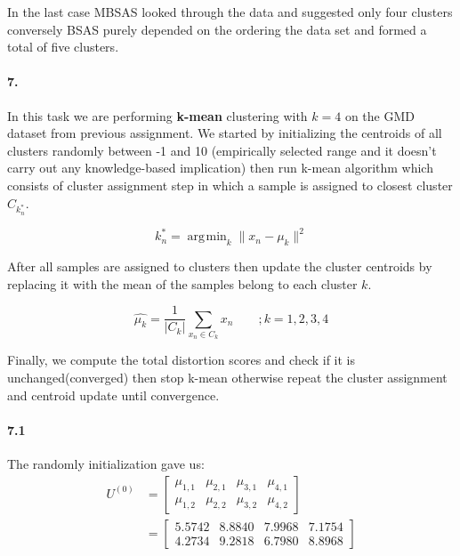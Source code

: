 \documentclass[a4paper]{article}
\DeclareMathOperator*{\argmin}{\arg\!\min}
\begin{document}
	\noindent In the last case MBSAS looked through the data and suggested only four clusters conversely BSAS purely depended on the ordering the data set and formed a total of five clusters.
	
\paragraph{7.} In this task we are performing \textbf{k-mean} clustering with $k = 4$ on the GMD dataset from previous assignment. We started by initializing the centroids of all clusters randomly between -1 and 10 (empirically selected range and it doesn't carry out any knowledge-based implication) then run k-mean algorithm which consists of cluster assignment step in which a sample is assigned to closest cluster $C_{k_n^{\ast}}$.

	\begin{equation}
		k_n^{\ast} = \argmin_k \|x_n - \mu_k\|^2
	\end{equation}
	
	After all samples are assigned to clusters then update the cluster centroids by replacing it with the mean of the samples belong to each cluster $k$.
	
	\begin{equation}
		\hat{\mu_k} = \frac{1}{|C_k|} \sum_{x_n \in C_k} x_n \qquad	; k=1,2,3,4
	\end{equation}
	
	Finally, we compute the total distortion scores and check if it is unchanged(converged) then stop k-mean otherwise repeat the cluster assignment and centroid update until convergence. \\
	
\paragraph{7.1} The randomly initialization gave us: \\

	\begin{align}
		U^{(0)} &= \begin{bmatrix}
				\mu_{1,1}  &  \mu_{2,1}  &  \mu_{3,1}  &  \mu_{4,1} \\ 
			    \mu_{1,2}  &  \mu_{2,2}  &  \mu_{3,2}  &  \mu_{4,2}
			\end{bmatrix} \\
			&= \begin{bmatrix}
				5.5742  &  8.8840  &  7.9968  &  7.1754 \\ 
			    4.2734  &  9.2818  &  6.7980  &  8.8968
			\end{bmatrix}
	\end{align}
	
\end{document}
